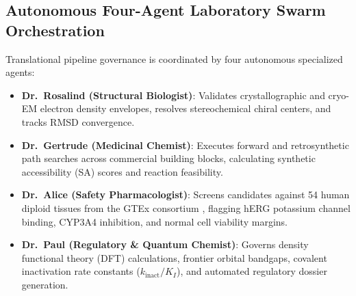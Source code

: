 \subsection{Autonomous Four-Agent Laboratory Swarm Orchestration}
Translational pipeline governance is coordinated by four autonomous specialized agents:
\begin{itemize}
    \item \textbf{Dr.~Rosalind (Structural Biologist)}: Validates crystallographic and cryo-EM electron density envelopes, resolves stereochemical chiral centers, and tracks RMSD convergence.
    \item \textbf{Dr.~Gertrude (Medicinal Chemist)}: Executes forward and retrosynthetic path searches across commercial building blocks, calculating synthetic accessibility (SA) scores and reaction feasibility.
    \item \textbf{Dr.~Alice (Safety Pharmacologist)}: Screens candidates against 54 human diploid tissues from the GTEx consortium \cite{gtex2020genotype}, flagging hERG potassium channel binding, CYP3A4 inhibition, and normal cell viability margins.
    \item \textbf{Dr.~Paul (Regulatory \& Quantum Chemist)}: Governs density functional theory (DFT) calculations, frontier orbital bandgaps, covalent inactivation rate constants ($k_{\text{inact}} / K_I$), and automated regulatory dossier generation.
\end{itemize}